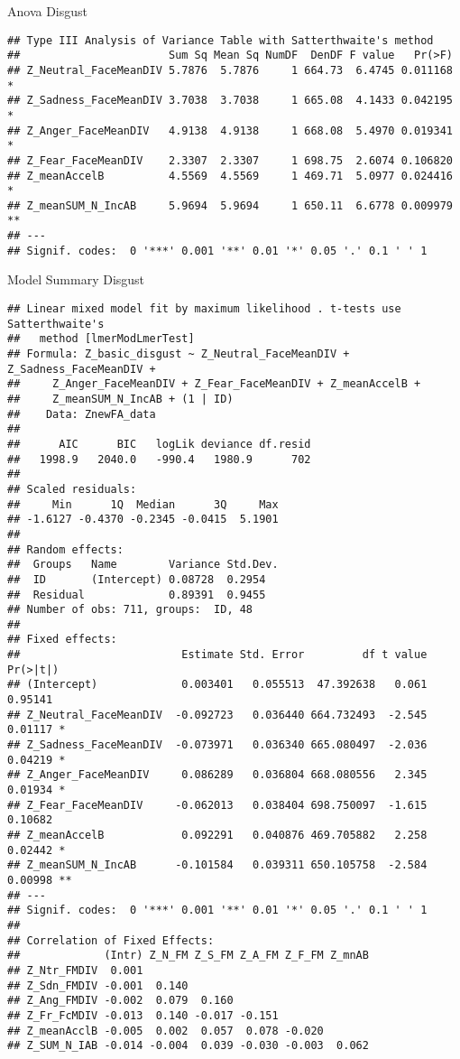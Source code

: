\documentclass[
]{article}
\begin{document}
Anova Disgust

\begin{verbatim}
## Type III Analysis of Variance Table with Satterthwaite's method
##                       Sum Sq Mean Sq NumDF  DenDF F value   Pr(>F)   
## Z_Neutral_FaceMeanDIV 5.7876  5.7876     1 664.73  6.4745 0.011168 * 
## Z_Sadness_FaceMeanDIV 3.7038  3.7038     1 665.08  4.1433 0.042195 * 
## Z_Anger_FaceMeanDIV   4.9138  4.9138     1 668.08  5.4970 0.019341 * 
## Z_Fear_FaceMeanDIV    2.3307  2.3307     1 698.75  2.6074 0.106820   
## Z_meanAccelB          4.5569  4.5569     1 469.71  5.0977 0.024416 * 
## Z_meanSUM_N_IncAB     5.9694  5.9694     1 650.11  6.6778 0.009979 **
## ---
## Signif. codes:  0 '***' 0.001 '**' 0.01 '*' 0.05 '.' 0.1 ' ' 1
\end{verbatim}

Model Summary Disgust

\begin{verbatim}
## Linear mixed model fit by maximum likelihood . t-tests use Satterthwaite's
##   method [lmerModLmerTest]
## Formula: Z_basic_disgust ~ Z_Neutral_FaceMeanDIV + Z_Sadness_FaceMeanDIV +  
##     Z_Anger_FaceMeanDIV + Z_Fear_FaceMeanDIV + Z_meanAccelB +  
##     Z_meanSUM_N_IncAB + (1 | ID)
##    Data: ZnewFA_data
## 
##      AIC      BIC   logLik deviance df.resid 
##   1998.9   2040.0   -990.4   1980.9      702 
## 
## Scaled residuals: 
##     Min      1Q  Median      3Q     Max 
## -1.6127 -0.4370 -0.2345 -0.0415  5.1901 
## 
## Random effects:
##  Groups   Name        Variance Std.Dev.
##  ID       (Intercept) 0.08728  0.2954  
##  Residual             0.89391  0.9455  
## Number of obs: 711, groups:  ID, 48
## 
## Fixed effects:
##                         Estimate Std. Error         df t value Pr(>|t|)   
## (Intercept)             0.003401   0.055513  47.392638   0.061  0.95141   
## Z_Neutral_FaceMeanDIV  -0.092723   0.036440 664.732493  -2.545  0.01117 * 
## Z_Sadness_FaceMeanDIV  -0.073971   0.036340 665.080497  -2.036  0.04219 * 
## Z_Anger_FaceMeanDIV     0.086289   0.036804 668.080556   2.345  0.01934 * 
## Z_Fear_FaceMeanDIV     -0.062013   0.038404 698.750097  -1.615  0.10682   
## Z_meanAccelB            0.092291   0.040876 469.705882   2.258  0.02442 * 
## Z_meanSUM_N_IncAB      -0.101584   0.039311 650.105758  -2.584  0.00998 **
## ---
## Signif. codes:  0 '***' 0.001 '**' 0.01 '*' 0.05 '.' 0.1 ' ' 1
## 
## Correlation of Fixed Effects:
##             (Intr) Z_N_FM Z_S_FM Z_A_FM Z_F_FM Z_mnAB
## Z_Ntr_FMDIV  0.001                                   
## Z_Sdn_FMDIV -0.001  0.140                            
## Z_Ang_FMDIV -0.002  0.079  0.160                     
## Z_Fr_FcMDIV -0.013  0.140 -0.017 -0.151              
## Z_meanAcclB -0.005  0.002  0.057  0.078 -0.020       
## Z_SUM_N_IAB -0.014 -0.004  0.039 -0.030 -0.003  0.062
\end{verbatim}
\end{document}
